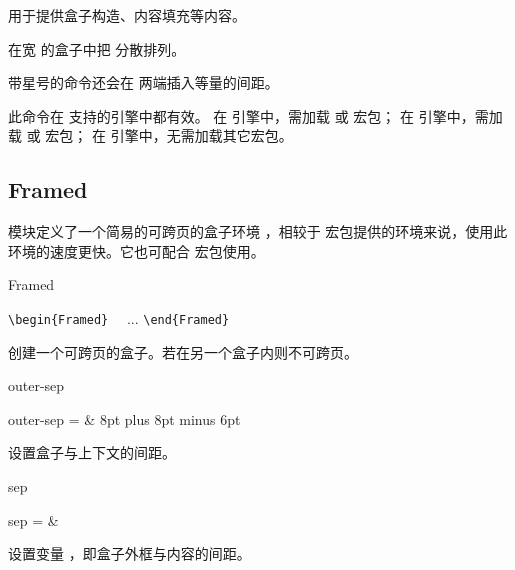 \documentclass{whudoc}
\begin{document}
 用于提供盒子构造、内容填充等内容。

\begin{function}{\spreadtext}
  \begin{syntax}
    \V\spreadtext   {} 
    \V\spreadtext *  
  \end{syntax}
在宽  的盒子中把  分散排列。

带星号的命令还会在  两端插入等量的间距。

此命令在 \WhuLaTeX 支持的引擎中都有效。
在 \LuaLaTeX 引擎中，需加载  或  宏包；
在 \XeLaTeX 引擎中，需加载  或  宏包；
在 \upLaTeX 引擎中，无需加载其它宏包。
\end{function}

\begin{xample}

\stopxamplecode
\xampleprint
\end{xample}

\subsection{Framed}

 模块定义了一个简易的可跨页的盒子环境 ，相较于 
 宏包提供的环境来说，使用此环境的速度更快。它也可配合 
宏包使用。

\begin{function}[type=environment]{Framed}
  \begin{syntax}
    \verb|\begin{Framed}| 
    ~~... 
    \verb|\end{Framed}|
  \end{syntax}
创建一个可跨页的盒子。若在另一个盒子内则不可跨页。
\end{function}

\begin{keyval}[path=frame]{outer-sep}
  \begin{syntax}
    outer-sep =  & 8pt plus 8pt minus 6pt 
  \end{syntax}
设置盒子与上下文的间距。
\end{keyval}

\begin{keyval}[path=frame]{sep}
  \begin{syntax}
    sep =  & \V{3\fboxsep}
  \end{syntax}
设置变量 ，即盒子外框与内容的间距。
\end{keyval}
\end{document}
